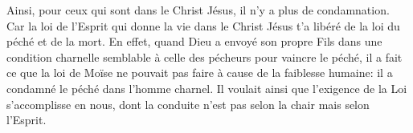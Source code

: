 Ainsi, pour ceux qui sont dans le Christ Jésus,
	il n’y a plus de condamnation.
Car la loi de l’Esprit qui donne la vie dans le Christ Jésus
	t’a libéré de la loi du péché et de la mort.
En effet, quand Dieu a envoyé son propre Fils
		dans une condition charnelle semblable à celle des pécheurs
		pour vaincre le péché,
	il a fait ce que la loi de Moïse ne pouvait pas faire
		à cause de la faiblesse humaine:
	il a condamné le péché dans l’homme charnel.
Il voulait ainsi que l’exigence de la Loi s’accomplisse en nous,
	dont la conduite n’est pas selon la chair mais selon l’Esprit.
